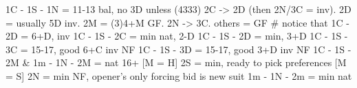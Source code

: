 1C - 1S - 1N = 11-13 bal, no 3D unless (4333)
    2C -> 2D (then 2N/3C = inv). 2D = usually 5D inv. 2M = (3)4+M GF. 
    2N -> 3C. others = GF
    # notice that 1C - 2D = 6+D, inv
1C - 1S - 2C = min nat, 2-D
1C - 1S - 2D = min, 3+D
1C - 1S - 3C = 15-17, good 6+C inv NF
1C - 1S - 3D = 15-17, good 3+D inv NF
1C - 1S - 2M & 1m - 1N - 2M = nat 16+
    [M = H] 2S = min, ready to pick preferences
    [M = S] 2N = min NF, opener's only forcing bid is new suit
1m - 1N - 2m = min nat